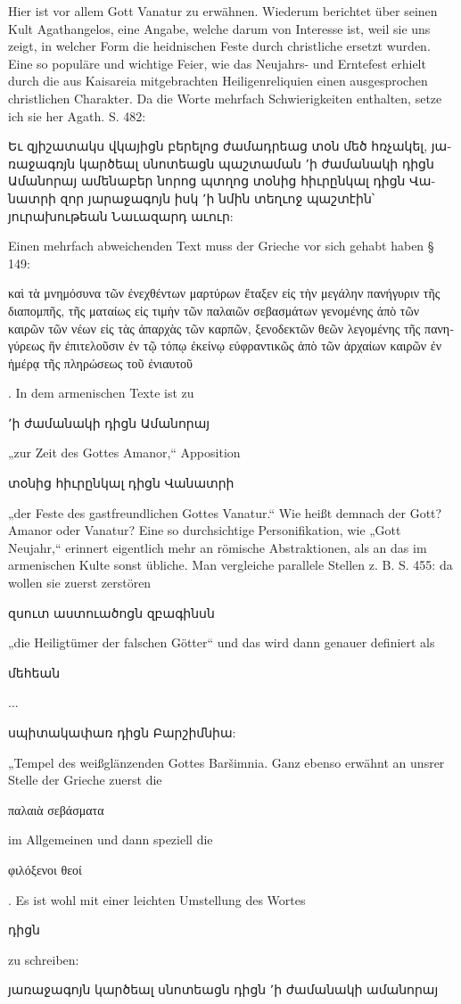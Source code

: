 \documentclass{article}
\begin{document}
Hier ist vor allem Gott Vanatur zu erwähnen. Wiederum berichtet über seinen Kult Agathangelos, eine Angabe, welche darum von Interesse ist, weil sie uns zeigt, in welcher Form die heidnischen Feste durch christliche ersetzt wurden. Eine so populäre und wichtige Feier, wie das Neujahrs- und Erntefest erhielt durch die aus Kaisareia mitgebrachten Heiligenreliquien einen ausgesprochen christlichen Charakter. Da die Worte mehrfach Schwierigkeiten enthalten, setze ich sie her Agath. S. 482: \begin{armenian}Եւ զյիշատակս վկայիցն բերելոց ժամադրեաց տօն մեծ հռչակել, յառաջագռյն կարծեալ սնոտեացն պաշտաման ՚ի ժամանակի դիցն Ամանորայ ամենաբեր նորոց պտղոց տօնից հիւրընկալ դիցն Վանատրի զոր յարաջագոյն իսկ ՚ի նմին տեղւոջ պաշտէին՝ յուրախութեան Նաւազարդ աւուր:\end{armenian} Einen mehrfach abweichenden Text muss der Grieche vor sich gehabt haben § 149: \begin{greek}καὶ τὰ μνημόσυνα τῶν ἐνεχθέντων μαρτύρων ἔταξεν εἰς τὴν μεγάλην πανήγυριν τῆς διαπομπῆς, τῆς ματαίως εἰς τιμὴν τῶν παλαιῶν σεβασμάτων γενομένης ἀπὸ τῶν καιρῶν τῶν νέων εἰς τὰς ἀπαρχὰς τῶν καρπῶν, ξενοδεκτῶν θεῶν λεγομένης τῆς πανηγύρεως ἣν ἐπιτελοῦσιν ἐν τῷ τόπῳ ἐκείνῳ εὐφραντικῶς ἀπὸ τῶν ἀρχαίων καιρῶν ἐν ἡμέρᾳ τῆς πληρώσεως τοῦ ἐνιαυτοῦ\end{greek}. In dem armenischen Texte ist zu \begin{armenian}՚ի ժամանակի դիցն Ամանորայ\end{armenian} „zur Zeit des Gottes Amanor,“ Apposition \begin{armenian}տօնից հիւրընկալ դիցն Վանատրի\end{armenian} „der Feste des gastfreundlichen Gottes Vanatur.“ Wie heißt demnach der Gott? Amanor oder Vanatur? Eine so durchsichtige Personifikation, wie „Gott Neujahr,“ erinnert eigentlich mehr an römische Abstraktionen, als an das im armenischen Kulte sonst übliche. Man vergleiche parallele Stellen z. B. S. 455: da wollen sie zuerst zerstören \begin{armenian}զսուտ աստուածոցն զբագինսն\end{armenian} „die Heiligtümer der falschen Götter“ und das wird dann genauer definiert als \begin{armenian}մեհեան\end{armenian}... \begin{armenian}սպիտակափառ դիցն Բարշիմնիա:\end{armenian} „Tempel des weißglänzenden Gottes Baršimnia. Ganz ebenso erwähnt an unsrer Stelle der Grieche zuerst die \begin{greek}παλαιὰ σεβάσματα\end{greek} im Allgemeinen und dann speziell die \begin{greek}φιλόξενοι θεοί\end{greek}. Es ist wohl mit einer leichten Umstellung des Wortes \begin{armenian}դիցն\end{armenian} zu schreiben: \begin{armenian}յառաջագոյն կարծեալ սնոտեացն դիցն ՚ի ժամանակի ամանորայ\end{armenian} 
\end{document}
